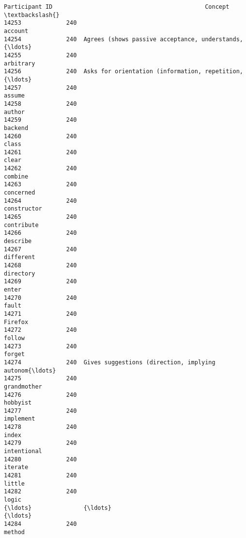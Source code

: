 \documentclass[11pt]{article}
\begin{document}
    \begin{Verbatim}[commandchars=\\\{\}]
       Participant ID                                            Concept  \textbackslash{}
14253             240                                            account   
14254             240  Agrees (shows passive acceptance, understands,{\ldots}   
14255             240                                          arbitrary   
14256             240  Asks for orientation (information, repetition,{\ldots}   
14257             240                                             assume   
14258             240                                             author   
14259             240                                            backend   
14260             240                                              class   
14261             240                                              clear   
14262             240                                            combine   
14263             240                                          concerned   
14264             240                                        constructor   
14265             240                                         contribute   
14266             240                                           describe   
14267             240                                          different   
14268             240                                          directory   
14269             240                                              enter   
14270             240                                              fault   
14271             240                                            Firefox   
14272             240                                             follow   
14273             240                                             forget   
14274             240  Gives suggestions (direction, implying autonom{\ldots}   
14275             240                                        grandmother   
14276             240                                           hobbyist   
14277             240                                          implement   
14278             240                                              index   
14279             240                                        intentional   
14280             240                                            iterate   
14281             240                                             little   
14282             240                                              logic   
{\ldots}               {\ldots}                                                {\ldots}   
14284             240                                             method   

\end{Verbatim}
\end{document}
